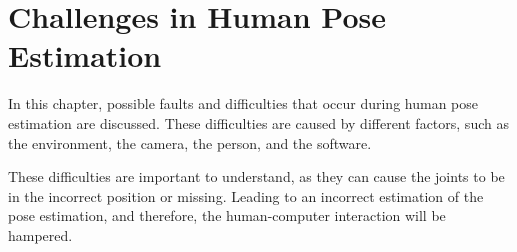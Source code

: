 \section{Challenges in Human Pose Estimation}
\label{sec:errors}

In this chapter, possible faults and difficulties that occur during human pose estimation are discussed. These difficulties are caused by different factors, such as the environment, the camera, the person, and the software. 

These difficulties are important to understand, as they can cause the joints to be in the incorrect position or missing. Leading to an incorrect estimation of the pose estimation, and therefore, the human-computer interaction will be hampered.



